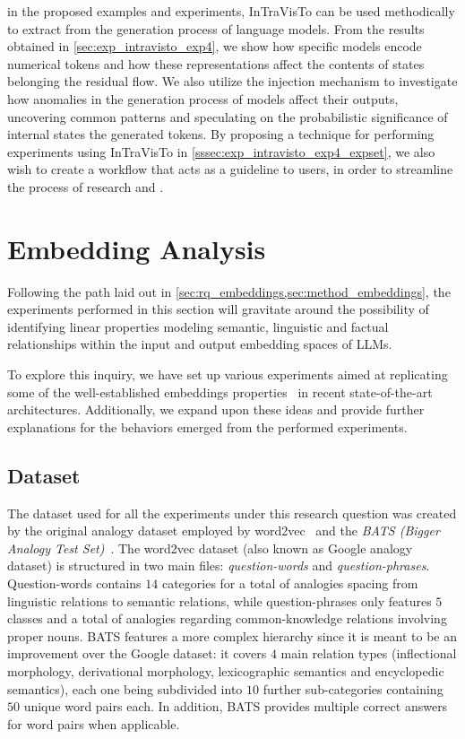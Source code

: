  in the proposed examples and experiments, InTraVisTo can be used methodically to extract  from the generation process of language models.
From the results obtained in \cref{sec:exp_intravisto_exp4}, we show how specific models encode numerical tokens and how these representations affect the contents of states belonging the residual flow.
We also utilize the injection mechanism to investigate how anomalies in the generation process of models affect their outputs, uncovering common patterns and speculating on the probabilistic significance of internal states  the generated tokens. 
By proposing a technique for performing experiments using InTraVisTo in \cref{sssec:exp_intravisto_exp4_expset}, we also wish to create a workflow that acts as a guideline to users, in order to streamline the process of research and .

\section{Embedding Analysis}\label{sec:exp_emb}

Following the path laid out in \cref{sec:rq_embeddings,sec:method_embeddings}, the experiments performed in this section will gravitate around the possibility of identifying linear properties modeling semantic, linguistic and factual relationships within the input and output embedding spaces of LLMs.

To explore this inquiry, we have set up various experiments aimed at replicating some of the well-established embeddings properties~\cite{mikolov2013} in recent state-of-the-art architectures.
Additionally, we expand upon these ideas and provide further explanations for the behaviors emerged from the performed experiments.

\subsection{Dataset}

The dataset used for all the experiments under this research question was created by  the original analogy dataset employed by word2vec~\cite{mikolov2013} and the \emph{BATS (Bigger Analogy Test Set)}~\cite{drozd2016}.
The word2vec dataset (also known as Google analogy dataset) is structured in two main files: \emph{question-words} and \emph{question-phrases}.
Question-words contains $14$ categories for a total of  analogies spacing from linguistic relations to semantic relations, while question-phrases only features $5$ classes and a total of  analogies regarding common-knowledge relations involving proper nouns.
BATS features a more complex hierarchy since it is meant to be an improvement over the Google dataset: it covers $4$ main relation types (inflectional morphology, derivational morphology, lexicographic semantics and encyclopedic semantics), each one being subdivided into $10$ further sub-categories containing $50$ unique word pairs each.
In addition, BATS provides multiple correct answers for word pairs when applicable. 

